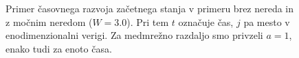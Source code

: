 \begin{figure}[H]
\caption{Primer časovnega razvoja začetnega stanja v primeru brez nereda in z močnim neredom ($W=3.0$). Pri tem $t$ označuje čas, $j$ pa mesto v enodimenzionalni verigi. Za medmrežno razdaljo smo privzeli $a=1$, enako tudi za enoto časa. }
\label{fig:light_cone} 
\end{figure}
